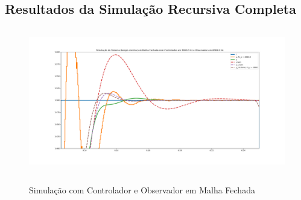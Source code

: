 \documentclass[
	12pt,				%
	article,			%
	openright,			%
	oneside,
	a4paper,			%
	chapter=TITLE,		%
	section=TITLE,		%
	english,			%
	french,				%
	spanish,			%
	brazil,				%
]{abntex2}
\begin{document}
	
	\begin{apendicesenv}
		\partapendices
% 		
        \clearpage
	
    	\chapter{Resultados da Simulação Recursiva Completa}
        	\label{ap-simul}
        	
        	\FloatBarrier
        	
        	\begin{figure}[htbp]
                	\centering
                	\caption{Simulação com Controlador e Observador em Malha Fechada}
                	\includegraphics[width=\textwidth,height=240px,keepaspectratio]{imgs/step_response_closedloop_observer_zoom_stepup.png}
                	\label{fig-step_response_closedloop_observer_zoom_stepup}
        	\end{figure}
        	

\end{apendicesenv}
\end{document}
